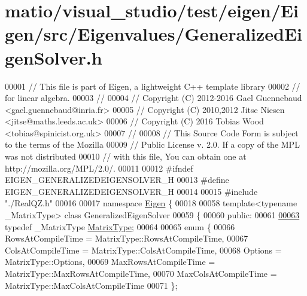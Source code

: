 \hypertarget{matio_2visual__studio_2test_2eigen_2_eigen_2src_2_eigenvalues_2_generalized_eigen_solver_8h_source}{}\section{matio/visual\+\_\+studio/test/eigen/\+Eigen/src/\+Eigenvalues/\+Generalized\+Eigen\+Solver.h}
\label{matio_2visual__studio_2test_2eigen_2_eigen_2src_2_eigenvalues_2_generalized_eigen_solver_8h_source}

\begin{DoxyCode}
00001 \textcolor{comment}{// This file is part of Eigen, a lightweight C++ template library}
00002 \textcolor{comment}{// for linear algebra.}
00003 \textcolor{comment}{//}
00004 \textcolor{comment}{// Copyright (C) 2012-2016 Gael Guennebaud <gael.guennebaud@inria.fr>}
00005 \textcolor{comment}{// Copyright (C) 2010,2012 Jitse Niesen <jitse@maths.leeds.ac.uk>}
00006 \textcolor{comment}{// Copyright (C) 2016 Tobias Wood <tobias@spinicist.org.uk>}
00007 \textcolor{comment}{//}
00008 \textcolor{comment}{// This Source Code Form is subject to the terms of the Mozilla}
00009 \textcolor{comment}{// Public License v. 2.0. If a copy of the MPL was not distributed}
00010 \textcolor{comment}{// with this file, You can obtain one at http://mozilla.org/MPL/2.0/.}
00011 
00012 \textcolor{preprocessor}{#ifndef EIGEN\_GENERALIZEDEIGENSOLVER\_H}
00013 \textcolor{preprocessor}{#define EIGEN\_GENERALIZEDEIGENSOLVER\_H}
00014 
00015 \textcolor{preprocessor}{#include "./RealQZ.h"}
00016 
00017 \textcolor{keyword}{namespace }\hyperlink{namespace_eigen}{Eigen} \{ 
00018 
00058 \textcolor{keyword}{template}<\textcolor{keyword}{typename} \_MatrixType> \textcolor{keyword}{class }GeneralizedEigenSolver
00059 \{
00060   \textcolor{keyword}{public}:
00061 
\hyperlink{group___eigenvalues___module_a56f4b9823bb9a267de3aaf48428cd247}{00063}     \textcolor{keyword}{typedef} \_MatrixType \hyperlink{group___eigenvalues___module_a56f4b9823bb9a267de3aaf48428cd247}{MatrixType};
00064 
00065     \textcolor{keyword}{enum} \{
00066       RowsAtCompileTime = MatrixType::RowsAtCompileTime,
00067       ColsAtCompileTime = MatrixType::ColsAtCompileTime,
00068       Options = MatrixType::Options,
00069       MaxRowsAtCompileTime = MatrixType::MaxRowsAtCompileTime,
00070       MaxColsAtCompileTime = MatrixType::MaxColsAtCompileTime
00071     \};

\end{DoxyCode}
